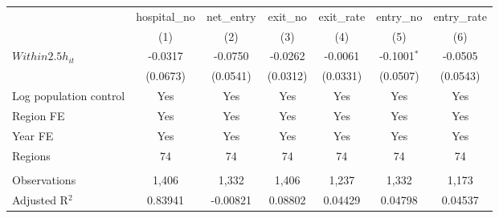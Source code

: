 \begingroup
\centering
\begin{tabular}{lcccccc}
   \toprule
                          & hospital\_no  & net\_entry  & exit\_no  & exit\_rate  & entry\_no     & entry\_rate \\    
                          & (1)           & (2)         & (3)       & (4)         & (5)           & (6)\\  
   \midrule 
   $Within2.5h_{it}$      & -0.0317       & -0.0750     & -0.0262   & -0.0061     & -0.1001$^{*}$ & -0.0505\\   
                          & (0.0673)      & (0.0541)    & (0.0312)  & (0.0331)    & (0.0507)      & (0.0543)\\   
   Log population control & Yes           & Yes         & Yes       & Yes         & Yes           & Yes\\  
   Region FE              & Yes           & Yes         & Yes       & Yes         & Yes           & Yes\\  
   Year FE                & Yes           & Yes         & Yes       & Yes         & Yes           & Yes\\  
   Regions                & 74            & 74          & 74        & 74          & 74            & 74\\  
    \\
   Observations           & 1,406         & 1,332       & 1,406     & 1,237       & 1,332         & 1,173\\  
   Adjusted R$^2$         & 0.83941       & -0.00821    & 0.08802   & 0.04429     & 0.04798       & 0.04537\\  
   \bottomrule
\end{tabular}
\par\endgroup
